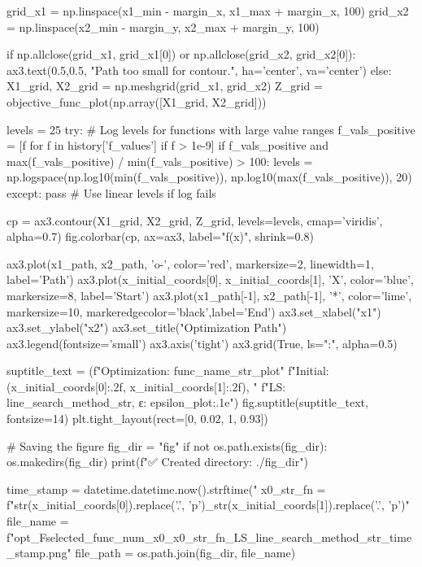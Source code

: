 \documentclass[12pt]{article} %
\begin{document}
\begin{python}
        grid_x1 = np.linspace(x1_min - margin_x, x1_max + margin_x, 100)
        grid_x2 = np.linspace(x2_min - margin_y, x2_max + margin_y, 100)
        
        if np.allclose(grid_x1, grid_x1[0]) or np.allclose(grid_x2, grid_x2[0]):
             ax3.text(0.5,0.5, "Path too small for contour.", ha='center', va='center')
        else:
            X1_grid, X2_grid = np.meshgrid(grid_x1, grid_x2)
            Z_grid = objective_func_plot(np.array([X1_grid, X2_grid]))
            
            levels = 25
            try: # Log levels for functions with large value ranges
                f_vals_positive = [f for f in history['f_values'] if f > 1e-9]
                if f_vals_positive and max(f_vals_positive) / min(f_vals_positive) > 100:
                    levels = np.logspace(np.log10(min(f_vals_positive)), np.log10(max(f_vals_positive)), 20)
            except: pass # Use linear levels if log fails
                
            cp = ax3.contour(X1_grid, X2_grid, Z_grid, levels=levels, cmap='viridis', alpha=0.7)
            fig.colorbar(cp, ax=ax3, label="f(x)", shrink=0.8)
            
            ax3.plot(x1_path, x2_path, 'o-', color='red', markersize=2, linewidth=1, label='Path')
            ax3.plot(x_initial_coords[0], x_initial_coords[1], 'X', color='blue', markersize=8, label='Start')
            ax3.plot(x1_path[-1], x2_path[-1], '*', color='lime', markersize=10, markeredgecolor='black',label='End')
            ax3.set_xlabel("x1")
            ax3.set_ylabel("x2")
            ax3.set_title("Optimization Path")
            ax3.legend(fontsize='small')
            ax3.axis('tight')
            ax3.grid(True, ls=":", alpha=0.5)

    suptitle_text = (f"Optimization: {func_name_str_plot}\n"
                     f"Initial: ({x_initial_coords[0]:.2f}, {x_initial_coords[1]:.2f}), "
                     f"LS: {line_search_method_str}, ε: {epsilon_plot:.1e}")
    fig.suptitle(suptitle_text, fontsize=14)
    plt.tight_layout(rect=[0, 0.02, 1, 0.93]) 

    # Saving the figure
    fig_dir = "fig"
    if not os.path.exists(fig_dir):
        os.makedirs(fig_dir)
        print(f"✅ Created directory: ./{fig_dir}")

    time_stamp = datetime.datetime.now().strftime("%
    x0_str_fn = f"{str(x_initial_coords[0]).replace('.', 'p')}_{str(x_initial_coords[1]).replace('.', 'p')}"
    file_name = f"opt_F{selected_func_num}_x0_{x0_str_fn}_LS_{line_search_method_str}_{time_stamp}.png"
    file_path = os.path.join(fig_dir, file_name)


\end{python}
\end{document}

